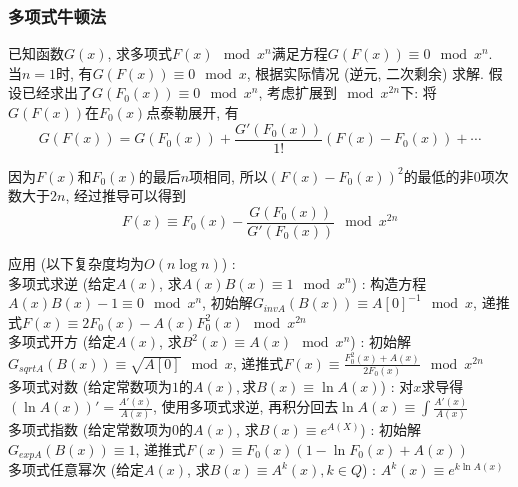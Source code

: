 \subsubsection{多项式牛顿法}

已知函数$G(x)$, 求多项式$F(x)\mod x^n$满足方程$G(F(x))\equiv 0\mod x^n$.\\

当$n=1$时, 有$G(F(x))\equiv 0\mod x$, 根据实际情况 (逆元, 二次剩余) 求解. 假设已经求出了$G(F_0(x))\equiv 0\mod x^n$, 考虑扩展到$\mod x^{2n}$下: 将$G(F(x))$在$F_0(x)$点泰勒展开, 有
\[
G(F(x))=G(F_0(x)) +\frac{G'(F_0(x))}{1!}(F(x)-F_0(x))
 +\cdots
\]

因为$F(x)$和$F_0(x)$的最后$n$项相同, 所以$(F(x)-F_0(x))^2$的最低的非$0$项次数大于$2n$, 经过推导可以得到\[F(x)\equiv F_0(x)-\frac{G(F_0(x))}{G'(F_0(x))}\mod x^{2n}\]

应用 (以下复杂度均为$O(n\log n)$) : \\

多项式求逆 (给定$A(x)$, 求$A(x)B(x)\equiv 1 \mod x^n$) : 构造方程$A(x)B(x)-1\equiv 0\mod x^n$, 初始解$G_{invA}(B(x))\equiv A[0]^{-1}\mod x$, 递推式$F(x)\equiv 2F_0(x)-A(x)F_0^2(x)\mod x^{2n}$\\

多项式开方 (给定$A(x)$, 求$B^2(x)\equiv A(x)\mod x^n$) : 初始解$G_{sqrtA}(B(x))\equiv \sqrt{A[0]}\mod x$, 递推式$F(x)\equiv \frac{F_0^2(x)+A(x)}{2F_0(x)}\mod x^{2n}$\\

多项式对数 (给定常数项为$1$的$A(x), 求B(x)\equiv \ln A(x)$) : 对$x$求导得$(\ln A(x))'=\frac{A'(x)}{A(x)}$, 使用多项式求逆, 再积分回去$\ln A(x)\equiv \int\frac{A'(x)}{A(x)}$\\

多项式指数 (给定常数项为$0​$的$A(x)​$, 求$B(x)\equiv e^{A(X)}​$) : 初始解$G_{expA}(B(x))\equiv 1​$, 递推式$F(x)\equiv F_0(x)(1-\ln F_0(x)+A(x))​$\\

多项式任意幂次 (给定$A(x)$, 求$B(x)\equiv A^k(x),k\in Q$) : $A^k(x)\equiv e^{k\ln A(x)}$